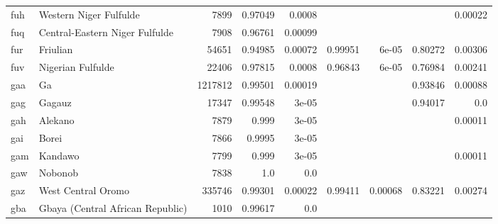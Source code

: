 \documentclass[11pt]{article}
\begin{document}
\begin{table*}[h]
{\begin{tabular}{llrrrrrrr}
fuh         & Western Niger Fulfulde         & 7899         & 0.97049         & 0.0008         &          &          &          & 0.00022         \\

fuq         & Central-Eastern Niger Fulfulde         & 7908         & 0.96761         & 0.00099         &          &          &          &          \\

fur         & Friulian         & 54651         & 0.94985         & 0.00072         & 0.99951         & 6e-05         & 0.80272         & 0.00306         \\

fuv         & Nigerian Fulfulde         & 22406         & 0.97815         & 0.0008         & 0.96843         & 6e-05         & 0.76984         & 0.00241         \\

gaa         & Ga         & 1217812         & 0.99501         & 0.00019         &          &          & 0.93846         & 0.00088         \\

gag         & Gagauz         & 17347         & 0.99548         & 3e-05         &          &          & 0.94017         & 0.0         \\

gah         & Alekano         & 7879         & 0.999         & 3e-05         &          &          &          & 0.00011         \\

gai         & Borei         & 7866         & 0.9995         & 3e-05         &          &          &          &          \\

gam         & Kandawo         & 7799         & 0.999         & 3e-05         &          &          &          & 0.00011         \\

gaw         & Nobonob         & 7838         & 1.0         & 0.0         &          &          &          &          \\

gaz         & West Central Oromo         & 335746         & 0.99301         & 0.00022         & 0.99411         & 0.00068         & 0.83221         & 0.00274         \\

gba         & Gbaya (Central African Republic)         & 1010         & 0.99617         & 0.0         &          &          &          &          \\


\end{tabular}}
\end{table*}
\end{document}
